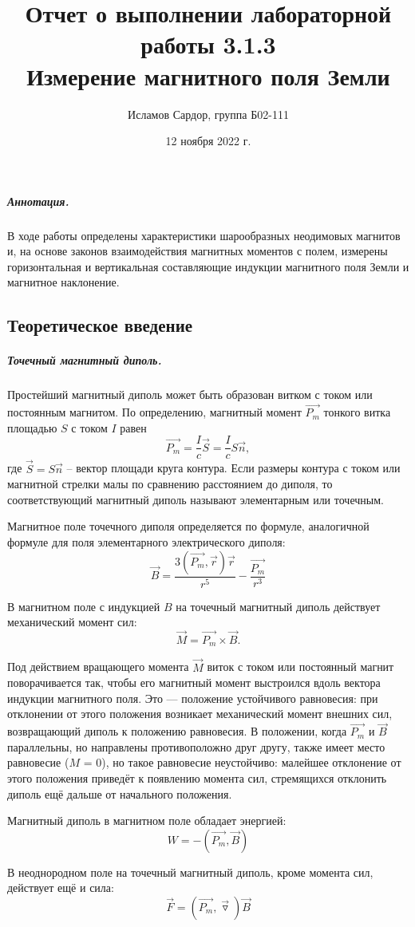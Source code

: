 \documentclass[12pt,a4paper]{article}
\title{Отчет о выполнении лабораторной работы 3.1.3\\
Измерение магнитного поля Земли}
\author{Исламов Сардор, группа Б02-111}
\date{12 ноября 2022 г.}
\begin{document}
\maketitle
\subparagraph*{Аннотация.} В ходе работы определены характеристики шарообразных неодимовых магнитов и, на основе законов взаимодействия магнитных моментов с полем, измерены горизонтальная и вертикальная составляющие индукции магнитного поля Земли и магнитное наклонение.

\subsection*{Теоретическое введение}
\subparagraph*{Точечный магнитный диполь.}
Простейший магнитный диполь может быть образован витком с током или постоянным магнитом. 
По определению, магнитный момент $\overrightarrow{P_m}$ тонкого витка площадью $S$ с током $I$ равен
\[
\overrightarrow{P_m}=\dfrac{I}{c}\vec{S}=\dfrac{I}{c}S\vec{n},
\]
где $\vec{S}=S\vec{n}$ -- вектор площади круга контура. 
Если размеры контура с током или магнитной стрелки малы по сравнению расстоянием до диполя, то соответствующий магнитный диполь называют элементарным или точечным.

Магнитное поле точечного диполя определяется по формуле, аналогичной формуле для поля элементарного электрического диполя:
\[
\vec{B}=\dfrac{3(\overrightarrow{P_m},\vec{r})\vec{r}}{r^5} - \dfrac{\overrightarrow{P_m}}{r^3}
\] 

В магнитном поле с индукцией $B$ на точечный магнитный диполь действует механический момент сил:
\[
\vec{M} = \overrightarrow{P_m}\times \vec{B}.
\]

Под действием вращающего момента $\vec{M}$ виток с током или постоянный магнит поворачивается так, чтобы его магнитный момент выстроился вдоль вектора индукции магнитного поля. 
Это — положение устойчивого равновесия: при отклонении от этого положения возникает механический момент внешних сил, возвращающий диполь к положению равновесия. 
В положении, когда $\overrightarrow{P_m}$ и $\vec{B}$ параллельны, но направлены противоположно друг другу, также имеет место равновесие ($M$ = 0),
но такое равновесие неустойчиво: малейшее отклонение от этого положения приведёт к появлению момента сил, стремящихся отклонить диполь ещё дальше от начального положения.

Магнитный диполь в магнитном поле обладает энергией:
\[
W = -(\overrightarrow{P_m},\vec{B})
\]

В неоднородном поле на точечный магнитный диполь, кроме момента сил, действует ещё и сила:
\[
\vec{F}=(\overrightarrow{P_m},\vec{\triangledown})\vec{B}
\]
\end{document}
